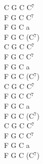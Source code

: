 \documentclass[a5paper, 10pt]{book}
\begin{document}
\begin{minipage}[t]{0.2\textwidth}
  C G C C$^7$\\
  F G C C$^7$\\
  F G C a\\
  F G C (C$^7$)\\

  C G C C$^7$\\
  F G C C$^7$\\
  F G C a\\
  F G C (C$^7$)\\

  C G C C$^7$\\
  F G C C$^7$\\
  F G C a\\
  F G C (C$^7$)\\

  C G C C$^7$\\
  F G C C$^7$\\
  F G C a\\
  F G C (C$^7$)\\
\end{minipage}


\newpage
\end{document}
